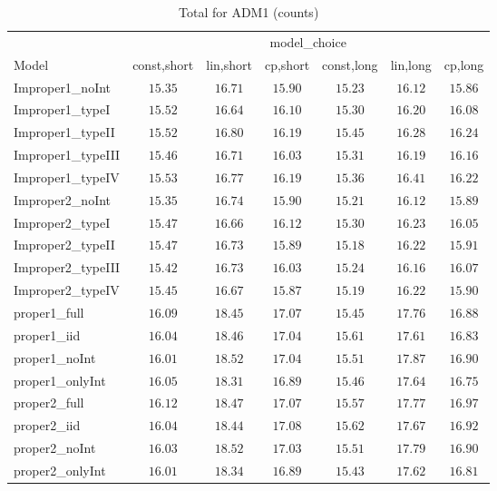 \begin{table}

\caption{\label{tab:model-choice-sc11}Total for ADM1 (counts)}
\centering
\begin{tabular}{lcccccc}
\hline
 & \multicolumn{6}{c}{model_choice} \\ 
Model  & const,short & lin,short & cp,short & const,long & lin,long & \multicolumn{1}{c}{cp,long} \\ 
\hline
Improper1_noInt  & $15.35$ & $16.71$ & $15.90$ & $15.23$ & $16.12$ & $15.86$ \\
Improper1_typeI  & $15.52$ & $16.64$ & $16.10$ & $15.30$ & $16.20$ & $16.08$ \\
Improper1_typeII  & $15.52$ & $16.80$ & $16.19$ & $15.45$ & $16.28$ & $16.24$ \\
Improper1_typeIII  & $15.46$ & $16.71$ & $16.03$ & $15.31$ & $16.19$ & $16.16$ \\
Improper1_typeIV  & $15.53$ & $16.77$ & $16.19$ & $15.36$ & $16.41$ & $16.22$ \\
Improper2_noInt  & $15.35$ & $16.74$ & $15.90$ & $15.21$ & $16.12$ & $15.89$ \\
Improper2_typeI  & $15.47$ & $16.66$ & $16.12$ & $15.30$ & $16.23$ & $16.05$ \\
Improper2_typeII  & $15.47$ & $16.73$ & $15.89$ & $15.18$ & $16.22$ & $15.91$ \\
Improper2_typeIII  & $15.42$ & $16.73$ & $16.03$ & $15.24$ & $16.16$ & $16.07$ \\
Improper2_typeIV  & $15.45$ & $16.67$ & $15.87$ & $15.19$ & $16.22$ & $15.90$ \\
proper1_full  & $16.09$ & $18.45$ & $17.07$ & $15.45$ & $17.76$ & $16.88$ \\
proper1_iid  & $16.04$ & $18.46$ & $17.04$ & $15.61$ & $17.61$ & $16.83$ \\
proper1_noInt  & $16.01$ & $18.52$ & $17.04$ & $15.51$ & $17.87$ & $16.90$ \\
proper1_onlyInt  & $16.05$ & $18.31$ & $16.89$ & $15.46$ & $17.64$ & $16.75$ \\
proper2_full  & $16.12$ & $18.47$ & $17.07$ & $15.57$ & $17.77$ & $16.97$ \\
proper2_iid  & $16.04$ & $18.44$ & $17.08$ & $15.62$ & $17.67$ & $16.92$ \\
proper2_noInt  & $16.03$ & $18.52$ & $17.03$ & $15.51$ & $17.79$ & $16.90$ \\
proper2_onlyInt  & $16.01$ & $18.34$ & $16.89$ & $15.43$ & $17.62$ & $16.81$ \\
\hline 
\end{tabular}


\end{table}